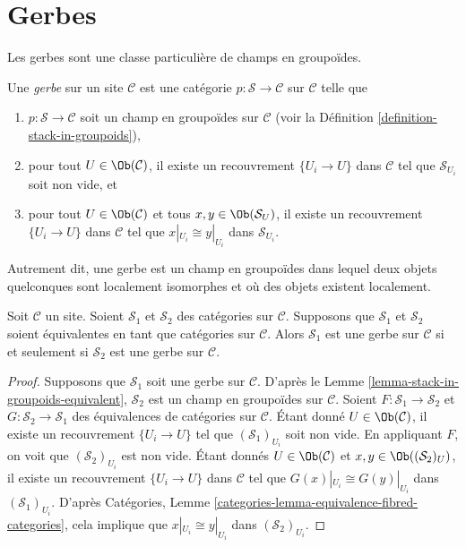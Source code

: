 \section{Gerbes}
\label{section-gerbes}

\noindent
Les gerbes sont une classe particulière de champs en groupoïdes.

\begin{definition}
\label{definition-gerbe}
Une {\it gerbe} sur un site $\mathcal{C}$ est une catégorie
$p : \mathcal{S} \to \mathcal{C}$ sur $\mathcal{C}$ telle que
\begin{enumerate}
\item $p : \mathcal{S} \to \mathcal{C}$ soit un champ
en groupoïdes sur $\mathcal{C}$ (voir la
Définition \ref{definition-stack-in-groupoids}),
\item pour tout $U \in \Ob(\mathcal{C})$, il existe
un recouvrement $\{U_i \to U\}$ dans $\mathcal{C}$ tel que
$\mathcal{S}_{U_i}$ soit non vide, et
\item pour tout $U \in \Ob(\mathcal{C})$ et tous
$x, y \in \Ob(\mathcal{S}_U)$, il existe
un recouvrement $\{U_i \to U\}$ dans $\mathcal{C}$ tel que
$x|_{U_i} \cong y|_{U_i}$ dans $\mathcal{S}_{U_i}$.
\end{enumerate}
\end{definition}

\noindent
Autrement dit, une gerbe est un champ en groupoïdes dans lequel deux objets
quelconques sont localement isomorphes et où des objets existent localement.

\begin{lemma}
\label{lemma-gerbe-equivalent}
Soit $\mathcal{C}$ un site.
Soient $\mathcal{S}_1$ et $\mathcal{S}_2$ des catégories sur $\mathcal{C}$.
Supposons que $\mathcal{S}_1$ et $\mathcal{S}_2$ soient équivalentes
en tant que catégories sur $\mathcal{C}$.
Alors $\mathcal{S}_1$ est une gerbe sur $\mathcal{C}$ si et seulement si
$\mathcal{S}_2$ est une gerbe sur $\mathcal{C}$.
\end{lemma}

\begin{proof}
Supposons que $\mathcal{S}_1$ soit une gerbe sur $\mathcal{C}$. D'après le
Lemme \ref{lemma-stack-in-groupoids-equivalent},
$\mathcal{S}_2$ est un champ en groupoïdes sur $\mathcal{C}$.
Soient $F : \mathcal{S}_1 \to \mathcal{S}_2$ et
$G : \mathcal{S}_2 \to \mathcal{S}_1$ des équivalences de catégories sur
$\mathcal{C}$. Étant donné $U \in \Ob(\mathcal{C})$, il existe
un recouvrement $\{U_i \to U\}$ tel que $(\mathcal{S}_1)_{U_i}$ soit
non vide. En appliquant $F$, on voit que $(\mathcal{S}_2)_{U_i}$ est non vide.
Étant donnés $U \in \Ob(\mathcal{C})$ et
$x, y \in \Ob((\mathcal{S}_2)_U)$, il existe
un recouvrement $\{U_i \to U\}$ dans $\mathcal{C}$ tel que
$G(x)|_{U_i} \cong G(y)|_{U_i}$ dans $(\mathcal{S}_1)_{U_i}$. D'après
Catégories, Lemme \ref{categories-lemma-equivalence-fibred-categories},
cela implique que $x|_{U_i} \cong y|_{U_i}$ dans $(\mathcal{S}_2)_{U_i}$.
\end{proof}


